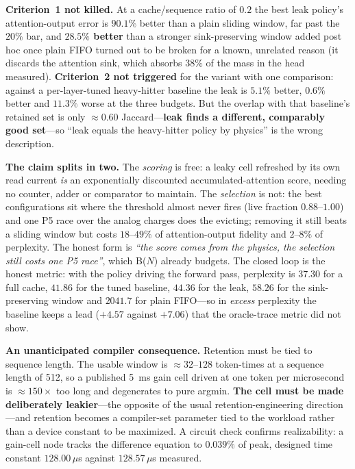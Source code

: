 \documentclass[11pt]{article}
\begin{document}
\textbf{Criterion~1 not killed.} At a cache/sequence ratio of $0.2$ the best leak policy's attention-output error is $90.1\%$ better than a plain sliding window, far past the $20\%$ bar, and \textbf{$28.5\%$ better} than a stronger sink-preserving window added post hoc once plain FIFO turned out to be broken for a known, unrelated reason (it discards the attention sink, which absorbs $38\%$ of the mass in the head measured). \textbf{Criterion~2 not triggered} for the variant with one comparison: against a per-layer-tuned heavy-hitter baseline the leak is $5.1\%$ better, $0.6\%$ better and $11.3\%$ worse at the three budgets. But the overlap with that baseline's retained set is only ${\approx}0.60$ Jaccard---\textbf{leak finds a different, comparably good set}---so ``leak equals the heavy-hitter policy by physics'' is the wrong description.

\textbf{The claim splits in two.} The \textit{scoring} is free: a leaky cell refreshed by its own read current \textit{is} an exponentially discounted accumulated-attention score, needing no counter, adder or comparator to maintain. The \textit{selection} is not: the best configurations sit where the threshold almost never fires (live fraction $0.88$--$1.00$) and one P5 race over the analog charges does the evicting; removing it still beats a sliding window but costs $18$--$49\%$ of attention-output fidelity and $2$--$8\%$ of perplexity. The honest form is \textit{``the score comes from the physics, the selection still costs one P5 race''}, which B($N$) already budgets. The closed loop is the honest metric: with the policy driving the forward pass, perplexity is $37.30$ for a full cache, $41.86$ for the tuned baseline, $44.36$ for the leak, $58.26$ for the sink-preserving window and $2041.7$ for plain FIFO---so in \textit{excess} perplexity the baseline keeps a lead ($+4.57$ against $+7.06$) that the oracle-trace metric did not show.

\textbf{An unanticipated compiler consequence.} Retention must be tied to sequence length. The usable window is ${\approx}32$--$128$ token-times at a sequence length of 512, so a published 5~ms gain cell driven at one token per microsecond is ${\approx}150\times$ too long and degenerates to pure argmin. \textbf{The cell must be made deliberately leakier}---the opposite of the usual retention-engineering direction---and retention becomes a compiler-set parameter tied to the workload rather than a device constant to be maximized. A circuit check confirms realizability: a gain-cell node tracks the difference equation to $0.039\%$ of peak, designed time constant $128.00\,\mu$s against $128.57\,\mu$s measured.
\end{document}
